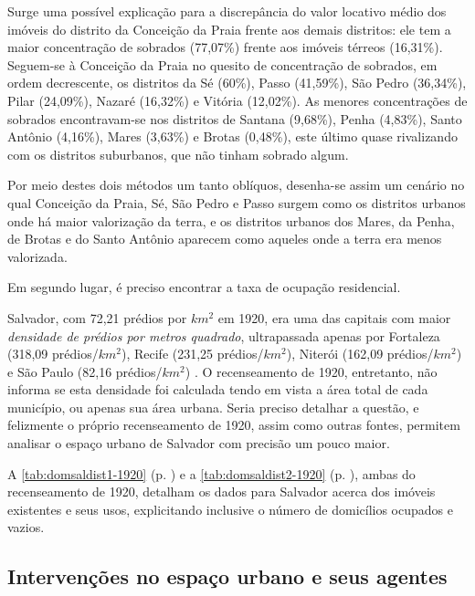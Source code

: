 Surge uma possível explicação para a discrepância do valor locativo médio dos imóveis do distrito da Conceição da Praia frente aos demais distritos: ele tem a maior concentração de sobrados (77,07\%) frente aos imóveis térreos (16,31\%). Seguem-se à Conceição da Praia no quesito de concentração de sobrados, em ordem decrescente, os distritos da Sé (60\%), Passo (41,59\%), São Pedro (36,34\%), Pilar (24,09\%), Nazaré (16,32\%) e Vitória (12,02\%). As menores concentrações de sobrados encontravam-se nos distritos de Santana (9,68\%), Penha (4,83\%), Santo Antônio (4,16\%), Mares (3,63\%) e Brotas (0,48\%), este último quase rivalizando com os distritos suburbanos, que não tinham sobrado algum.

Por meio destes dois métodos um tanto oblíquos, desenha-se assim um cenário no qual Conceição da Praia, Sé, São Pedro e Passo surgem como os distritos urbanos onde há maior valorização da terra, e os distritos urbanos dos Mares, da Penha, de Brotas e do Santo Antônio aparecem como aqueles onde a terra era menos valorizada.

Em segundo lugar, é preciso encontrar a taxa de ocupação residencial.

Salvador, com 72,21 prédios por $km^{2}$ em 1920, era uma das capitais com maior \textit{densidade de prédios por metros quadrado}, ultrapassada apenas por Fortaleza (318,09 prédios/$km^{2}$), Recife (231,25 prédios/$km^{2}$), Niterói (162,09 prédios/$km^{2}$) e São Paulo (82,16 prédios/$km^{2}$) \cite[p.~XV]{brasil_censo46_1920}. O recenseamento de 1920, entretanto, não informa se esta densidade foi calculada tendo em vista a área total de cada município, ou apenas sua área urbana. Seria preciso detalhar a questão, e felizmente o próprio recenseamento de 1920, assim como outras fontes, permitem analisar o espaço urbano de Salvador com precisão um pouco maior.



A \autoref{tab:domsaldist1-1920} (p. \pageref{tab:domsaldist1-1920}) e a \autoref{tab:domsaldist2-1920} (p. \pageref{tab:domsaldist2-1920}), ambas do recenseamento de 1920, detalham os dados para Salvador acerca dos imóveis existentes e seus usos, explicitando inclusive o número de domicílios ocupados e vazios.




\subsection{Intervenções no espaço urbano e seus agentes}\label{subsec:1.4.3}

